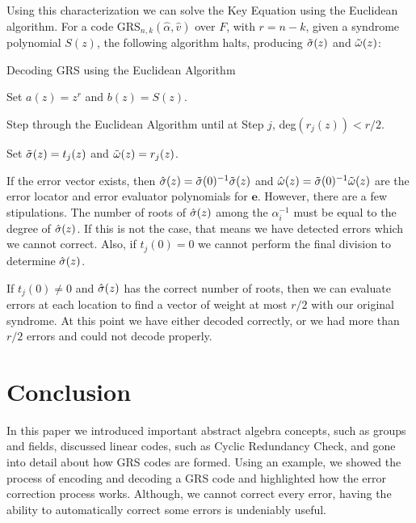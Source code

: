 \documentclass{article}
\begin{document}
Using this characterization we can solve the Key Equation using the Euclidean algorithm. For a code $\text{GRS}_{n,k}(\hat{\alpha}, \hat{v})$ over $F$, with $r = n - k$, given a syndrome polynomial $S(z)$, the following algorithm halts, producing $\Tilde{\sigma}(z)$ and $\Tilde{\omega}(z)$:
\begin{algorithm}[H]
	\caption{Decoding GRS using the Euclidean Algorithm\label{decoding}}
	Set $a(z) = z^{r}$ and $b(z) = S(z)$.
	
	Step through the Euclidean Algorithm until at Step $j$, deg$(r_{j}(z)) < r/2$.
	
	Set $\Tilde{\sigma}(z) = t_{j}(z)$ and $\Tilde{\omega}(z) = r_{j}(z)$.
\end{algorithm}
If the error vector exists, then $\Hat{\sigma}(z) = \Tilde{\sigma}(0)^{-1}\Tilde{\sigma}(z)$ and $\Hat{\omega}(z) = \Tilde{\sigma}(0)^{-1}\Tilde{\omega}(z)$ are the error locator and error evaluator polynomials for $\textbf{e}$. However, there are a few stipulations. The number of roots of $\Hat{\sigma}(z)$ among the $\alpha_{i}^{-1}$ must be equal to the degree of $\Hat{\sigma}(z)$. If this is not the case, that means we have detected errors which we cannot correct. Also, if $t_{j}(0) = 0$ we cannot perform the final division to determine $\Hat{\sigma}(z)$.

If $t_{j}(0) \neq 0$ and $\Hat{\sigma}(z)$ has the correct number of roots, then we can evaluate errors at each location to find a vector of weight at most $r/2$ with our original syndrome. At this point we have either decoded correctly, or we had more than $r/2$ errors and could not decode properly.

\section{Conclusion}
In this paper we introduced important abstract algebra concepts, such as groups and fields, discussed linear codes, such as Cyclic Redundancy Check, and gone into detail about how GRS codes are formed. Using an example, we showed the process of encoding and decoding a GRS code and highlighted how the error correction process works. Although, we cannot correct every error, having the ability to automatically correct some errors is undeniably useful.



\end{document}
